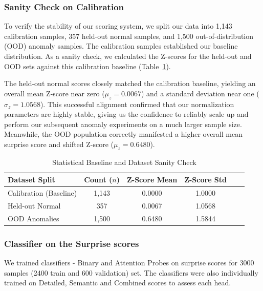 \documentclass{article}
\begin{document}
\subsubsection{Sanity Check on Calibration}
To verify the stability of our scoring system, we split our data into 1,143 calibration samples, 357 held-out normal samples, and 1,500 out-of-distribution (OOD) anomaly samples. The calibration samples established our baseline distribution. As a sanity check, we calculated the Z-scores for the held-out and OOD sets against this calibration baseline (Table~\ref{tab:sanity_check}). 

The held-out normal scores closely matched the calibration baseline, yielding an overall mean Z-score near zero ($\mu_z = 0.0067$) and a standard deviation near one ($\sigma_z = 1.0568$). This successful alignment confirmed that our normalization parameters are highly stable, giving us the confidence to reliably scale up and perform our subsequent anomaly experiments on a much larger sample size. Meanwhile, the OOD population correctly manifested a higher overall mean surprise score and shifted Z-score ($\mu_z = 0.6480$).

\begin{table}[htbp]
\centering
\caption{Statistical Baseline and Dataset Sanity Check}
\label{tab:sanity_check}
\begin{tabular}{lccccc}
\hline
\textbf{Dataset Split} & \textbf{Count ($n$)}  & \textbf{Z-Score Mean} & \textbf{Z-Score Std} \\ \hline
Calibration (Baseline) & 1,143                         & 0.0000                & 1.0000               \\
Held-out Normal        & 357                 & 0.0067                & 1.0568               \\
OOD Anomalies          & 1,500                           & 0.6480                & 1.5844               \\ \hline
\end{tabular}
\end{table}


\subsubsection{Classifier on the Surprise scores}
We trained classifiers - Binary and Attention Probes on surprise scores for 3000 samples (2400 train and 600 validation) set. The classifiers were also individually trained on Detailed, Semantic and Combined scores to assess each head.
\end{document}
